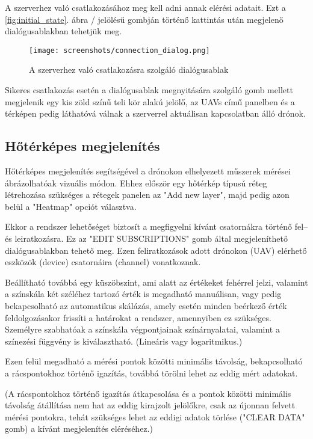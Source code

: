 A szerverhez való csatlakozásához meg kell adni annak elérési adatait. Ezt a
\ref{fig:initial_state}. ábra / jelölésű gombján történő kattintás
után megjelenő dialógusablakban tehetjük meg.

\begin{figure}[H]
  \center
  \texttt{[image: screenshots/connection\_dialog.png]}
  \caption{A szerverhez való csatlakozásra szolgáló dialógusablak}
  \label{fig:connection_dialog}
\end{figure}

Sikeres csatlakozás esetén a dialógusablak megnyitására szolgáló gomb mellett
megjelenik egy kis zöld színű teli kör alakú jelölő, az UAVs című panelben és a
térképen pedig láthatóvá válnak a szerverrel aktuálisan kapcsolatban álló
drónok.


\subsection{Hőtérképes megjelenítés}

Hőtérképes megjelenítés segítségével a drónokon elhelyezett műszerek mérései
ábrázolhatóak vizuális módon. Ehhez először egy hőtérkép típusú réteg
létrehozása szükséges a rétegek panelen az "Add new layer", majd pedig azon
belül a "Heatmap" opciót választva.

Ekkor a rendszer lehetőséget biztosít a megfigyelni kívánt csatornákra történő
fel-- és leiratkozásra. Ez az "EDIT SUBSCRIPTIONS" gomb által megjeleníthető
dialógusablakban tehető meg. Ezen feliratkozások adott drónokon (UAV) elérhető
eszközök (device) csatornáira (channel) vonatkoznak.

Beállítható továbbá egy küszöbszint, ami alatt az értékeket fehérrel jelzi,
valamint a színskála két széléhez tartozó érték is megadható manuálisan, vagy
pedig bekapcsolható az automatikus skálázás, amely esetén minden beérkező érték
feldolgozásakor frissíti a határokat a rendszer, amennyiben ez szükséges.
Személyre szabhatóak a színskála végpontjainak színárnyalatai, valamint a
színezési függvény is kiválasztható. (Lineáris vagy logaritmikus.)

Ezen felül megadható a mérési pontok közötti minimális távolság, bekapcsolható a
rácspontokhoz történő igazítás, továbbá törölni lehet az eddig mért adatokat.

(A rácspontokhoz történő igazítás átkapcsolása és a pontok közötti minimális
távolság átállítása nem hat az eddig kirajzolt jelölőkre, csak az újonnan
felvett mérési pontokra, tehát szükséges lehet az eddigi adatok törlése ("CLEAR
DATA" gomb) a kívánt megjelenítés eléréséhez.)

